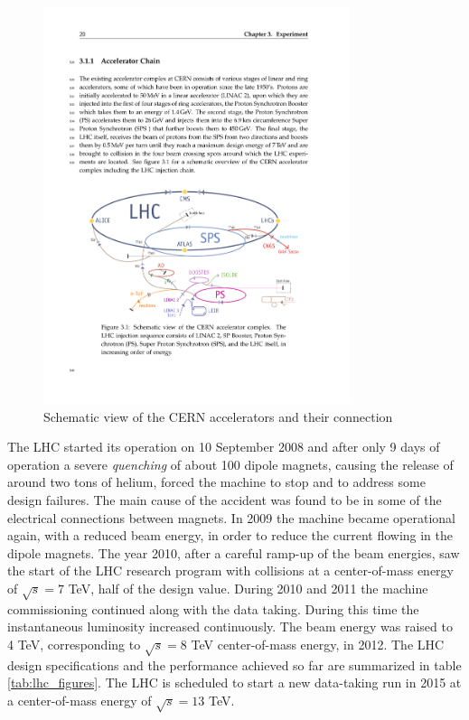 \begin{figure}
\begin{center}
\includegraphics[angle=-0,width=0.8\textwidth]{2_LHC_and_CMS/pics/LHC.pdf}
\caption{Schematic view of the CERN accelerators and their connection
\label{fig:cern_accelerators}
}
\end{center}
\end{figure}

The LHC started its operation on 10 September 2008 and after only 9 days of operation a severe \emph{quenching} of about 100 dipole magnets, causing the release of around two tons of helium, forced the machine to stop and to address some design failures. The main cause of the accident was found to be in some of the electrical connections between magnets. In 2009 the machine became operational again, with a reduced beam energy, in order to reduce the current flowing in the dipole magnets. The year 2010, after a careful ramp-up of the beam energies, saw the start of the LHC research program with collisions at a center-of-mass energy of $\sqrt{s} = 7$ TeV, half of the design value. During 2010 and 2011 the machine commissioning continued along with the data taking. During this time the instantaneous luminosity increased continuously. The beam energy was raised to 4 TeV, corresponding to $\sqrt{s} = 8$ TeV center-of-mass energy, in 2012. The LHC design specifications and the performance achieved so far are summarized in table \ref{tab:lhc_figures}. The LHC is scheduled to start a new data-taking run in 2015 at a center-of-mass energy of $\sqrt{s} = 13$ TeV.

